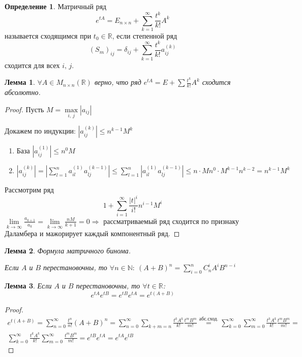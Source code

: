 \documentclass[a4paper,12pt]{article}
\renewcommand{\leq}{\ensuremath{\leqslant}}
\theoremstyle{plain}
\newtheorem{lemma}{Лемма}[section]
\theoremstyle{definition}
\newtheorem{definition}{Определение}[section]
\theoremstyle{remark}
\begin{document}
\begin{definition}
	Матричный ряд
	\[e^{tA} = E_{n \times n} + \sum_{k = 1}^\infty \frac{t^k}{k!}A^k\]
	называется сходящимся при $t_0 \in \mathbb{R}$, если степенной ряд
	\[(S_m)_{ij} = \delta_{ij} + \sum_{k = 1}^\infty \frac{t^k}{k!}a_{ij}^{(k)}\]
	сходится для всех $i,\,j$.
\end{definition}

\begin{lemma}
	$\forall A \in M_{n \times n}(\mathbb{R})$ верно, что ряд $e^{tA} = E + \sum \frac{t^k}{k!}A^k$ сходится абсолютно.
\end{lemma}

\begin{proof}
	Пусть $M = \max\limits_{i,\,j}|a_{ij}|$

	Докажем по индукции: $|a_{ij}^{(k)}| \leq n^{k-1}M^k$
	\begin{enumerate}
		\item База $|a_{ij}^{(1)}| \leq n^0M$
		\item $|a_{ij}^{(k)}| = |\sum_{l = 1}^n a_{il}^{(1)}a_{lj}^{(k-1)}| \leq \sum_{l = 1}^n |a_{il}^{(1)}a_{lj}^{(k-1)}| \leq n\cdot Mn^0\cdot M^{k - 1}n^{k-2} = n^{k-1}M^k$
	\end{enumerate}
	Рассмотрим ряд
	\[1 + \sum_{i = 1}^\infty \frac{|t|^i}{i!}n^{i - 1}M^i\]
	$\lim\limits_{k \to \infty} \frac{a_{k + 1}}{a_k} = \lim\limits_{k \to \infty} \frac{nM}{k + 1} = 0 \Rightarrow$ рассматриваемый ряд сходится по признаку Даламбера и мажорирует каждый компонентный ряд.
\end{proof}

\begin{lemma}
	Формула матричного бинома.

	Если $A$ и $B$ перестановочны, то $\forall n \in \mathbb{N}:\: (A + B)^n = \sum_{i = 0}^n C_n^iA^iB^{n - i}$
\end{lemma}

\begin{lemma}
	Если $A$ и $B$ перестановочны, то $\forall t \in \mathbb{R}$:
	\[e^{tA}e^{tB} = e^{tB}e^{tA} = e^{t(A + B)}\]
\end{lemma}
\begin{proof}
	\begin{align*}
		e^{t(A + B)} = \sum_{n = 0}^\infty \frac{t^n}{n!}(A + B)^n = \sum_{n = 0}^\infty \sum_{k + m = n} \frac{t^kA^k}{k!}\frac{t^mB^m}{m!} \overset{\text{абс.сход.}}{=} \sum_{k = 0}^\infty\sum_{m=0}^\infty \frac{t^kA^k}{k!}\frac{t^mB^m}{m!} = \\ \sum_{k = 0}^\infty\frac{t^kA^k}{k!}\sum_{m=0}^\infty\frac{t^mB^m}{m!} = e^{tB}e^{tA} = e^{tA}e^{tB}
	\end{align*}
\end{proof}
\end{document}
